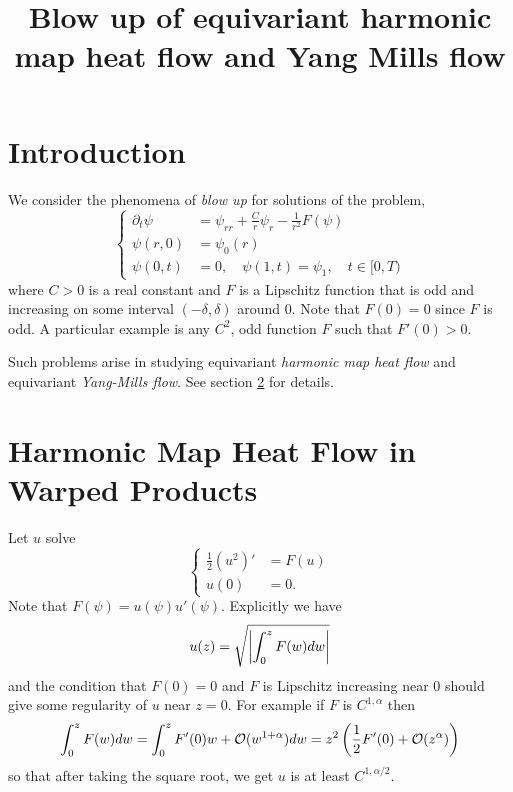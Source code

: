 \documentclass{amsart}
\begin{document}
\title[]
 {Blow up of equivariant harmonic map heat flow and Yang Mills flow}

\curraddr{}
\email{}

\dedicatory{}
\subjclass[2010]{}
\keywords{}

\begin{abstract}
\end{abstract}

\maketitle

\section{Introduction}
\label{sec:intro}

We consider the phenomena of \emph{blow up} for solutions of the problem,
\begin{equation}
\label{eq:pde}
\begin{cases}
\partial_t \psi &= \psi_{rr} + \frac{C}{r} \psi_r - \frac{1}{r^2} F(\psi) \\
\psi(r, 0) &= \psi_0(r) \\
\psi(0, t) &= 0, \quad \psi(1, t) = \psi_1, \quad t \in [0, T)
\end{cases}
\end{equation}
where \(C > 0\) is a real constant and \(F\) is a Lipschitz function that is odd and increasing on some interval \((-\delta, \delta)\) around \(0\). Note that \(F(0) = 0\) since \(F\) is odd. A particular example is any \(C^2\), odd function \(F\) such that \(F'(0) > 0\).

Such problems arise in studying equivariant \emph{harmonic map heat flow} and equivariant \emph{Yang-Mills flow}. See section \ref{sec:harmonic_map_heat_flow} for details.

\section{Harmonic Map Heat Flow in Warped Products}
\label{sec:harmonic_map_heat_flow}

Let \(u\) solve
\[
\begin{cases}
\frac{1}{2} (u^2)' &= F(u) \\
u(0) &= 0.
\end{cases}
\]
Note that \(F(\psi) = u(\psi) u'(\psi)\). Explicitly we have
\[
u(z) = \sqrt{\left|{\int_0^z F(w) dw}\right|}
\]
and the condition that \(F(0) = 0\) and \(F\) is Lipschitz increasing near \(0\) should give some regularity of \(u\) near \(z = 0\). For example if \(F\) is \(C^{1,\alpha}\) then
\[
\int_0^z F(w) dw = \int_0^z F'(0) w + \operatorname{\mathcal{O}}(w^{1+\alpha}) dw = z^2\left(\frac{1}{2} F'(0) + \operatorname{\mathcal{O}}(z^{\alpha})\right)
\]
so that after taking the square root, we get \(u\) is at least \(C^{1,\alpha/2}\).
\end{document}
